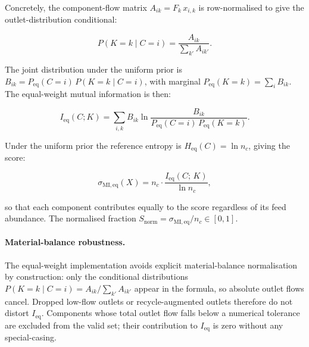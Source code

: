 \documentclass[11pt,a4paper]{article}
\theoremstyle{definition}
\theoremstyle{plain}
\begin{document}
Concretely, the component-flow matrix $A_{ik} = F_k\,x_{i,k}$ is row-normalised to give the outlet-distribution conditional:

\begin{equation}
 P(K = k \mid C = i)
 = \frac{A_{ik}}{\displaystyle\sum_{k'} A_{ik'}}.
\end{equation}

The joint distribution under the uniform prior is $B_{ik} = P_{\mathrm{eq}}(C=i)\,P(K=k\mid C=i)$, with marginal $P_{\mathrm{eq}}(K=k) = \sum_i B_{ik}$. The equal-weight mutual information is then:

\begin{equation}
 I_{\mathrm{eq}}(C;K)
 = \sum_{i,k} B_{ik}
  \ln\!\frac{B_{ik}}{P_{\mathrm{eq}}(C=i)\,P_{\mathrm{eq}}(K=k)}.
\end{equation}

Under the uniform prior the reference entropy is $H_{\mathrm{eq}}(C) = \ln n_c$, giving the score:

\begin{equation}
 \sigma_{\mathrm{MI,eq}}(X)
 = n_c \cdot \frac{I_{\mathrm{eq}}(C;\,K)}{\ln n_c},
 \label{eq:sigma_MI_eq}
\end{equation}

so that each component contributes equally to the score regardless of its feed abundance. The normalised fraction $S_{\mathrm{norm}} = \sigma_{\mathrm{MI,eq}}/n_c \in [0,1]$.

\paragraph{Material-balance robustness.}
The equal-weight implementation avoids explicit material-balance normalisation by construction: only the conditional distributions $P(K=k \mid C=i) = A_{ik}/\sum_{k'} A_{ik'}$ appear in the formula, so absolute outlet flows cancel. Dropped low-flow outlets or recycle-augmented outlets therefore do not distort $I_{\mathrm{eq}}$. Components whose total outlet flow falls below a numerical tolerance are excluded from the valid set; their contribution to $I_{\mathrm{eq}}$ is zero without any special-casing.
\end{document}
